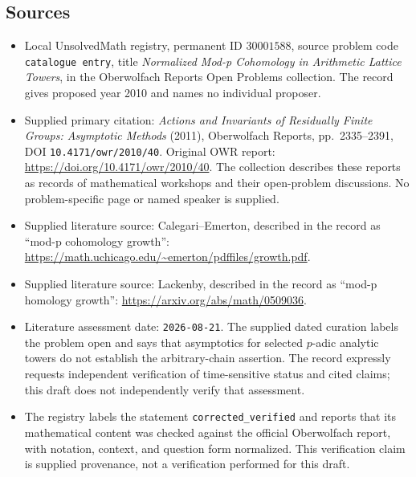 \documentclass[11pt]{article}
\begin{document}
\subsection{Sources}
\begin{itemize}
\item Local UnsolvedMath registry, permanent ID \(30001588\), source problem code \texttt{catalogue entry}, title \emph{Normalized Mod-p Cohomology in Arithmetic Lattice Towers}, in the Oberwolfach Reports Open Problems collection. The record gives proposed year 2010 and names no individual proposer.
\item Supplied primary citation: \emph{Actions and Invariants of Residually Finite Groups: Asymptotic Methods} (2011), Oberwolfach Reports, pp.~2335--2391, DOI \texttt{10.4171/owr/2010/40}. Original OWR report: \url{https://doi.org/10.4171/owr/2010/40}. The collection describes these reports as records of mathematical workshops and their open-problem discussions. No problem-specific page or named speaker is supplied.
\item Supplied literature source: Calegari--Emerton, described in the record as ``mod-p cohomology growth'': \url{https://math.uchicago.edu/~emerton/pdffiles/growth.pdf}.
\item Supplied literature source: Lackenby, described in the record as ``mod-p homology growth'': \url{https://arxiv.org/abs/math/0509036}.
\item Literature assessment date: \texttt{2026-08-21}. The supplied dated curation labels the problem open and says that asymptotics for selected \(p\)-adic analytic towers do not establish the arbitrary-chain assertion. The record expressly requests independent verification of time-sensitive status and cited claims; this draft does not independently verify that assessment.
\item The registry labels the statement \texttt{corrected\_verified} and reports that its mathematical content was checked against the official Oberwolfach report, with notation, context, and question form normalized. This verification claim is supplied provenance, not a verification performed for this draft.
\end{itemize}
\end{document}
